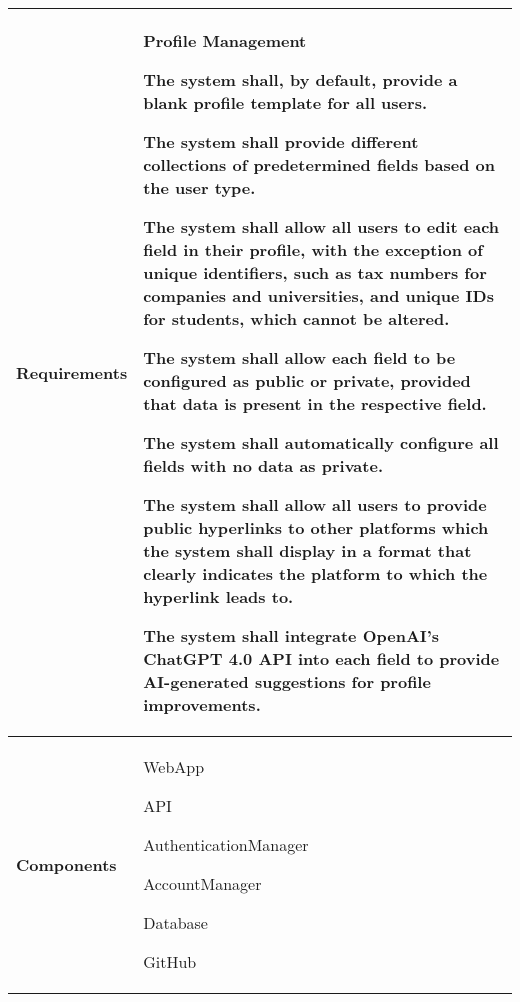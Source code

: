 \begin{table}[h]
    \centering
    \renewcommand{\arraystretch}{1.5} %
    \begin{tabular}{|C{0.3\textwidth}|L{0.65\textwidth}|} %
        \hline
        \textbf{Requirements} & 
        \textbf{Profile Management} \par
        [FR13] The system shall, by default, provide a blank profile template for
        all users. \par
       [FR14] The system shall provide different collections of predetermined fields
        based on the user type. \par
        [FR15] The system shall allow all users to edit each field in their profile,
        with the exception of unique identifiers, such as tax numbers for
        companies and universities, and unique IDs for students, which
        cannot be altered. \par
        [FR16] The system shall allow each field to be configured as public or
        private, provided that data is present in the respective field. \par
        [FR17] The system shall automatically configure all fields with no data as
        private. \par
        [FR18] The system shall allow all users to provide public hyperlinks to
        other platforms which the system shall display in a format that
        clearly indicates the platform to which the hyperlink leads to. \par
        [FR19] The system shall integrate OpenAI’s ChatGPT 4.0 API into each
        field to provide AI-generated suggestions for profile improvements. \\
        \hline
        \textbf{Components} & 
        WebApp \par
        API \par
        AuthenticationManager \par
        AccountManager \par
        Database \par
        GitHub \\
        \hline
    \end{tabular}
\end{table}


